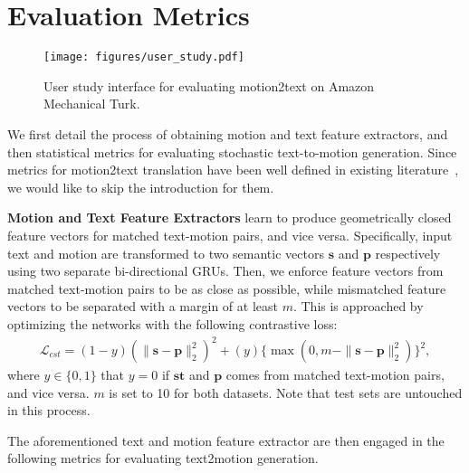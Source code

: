 \documentclass[runningheads]{llncs}
\newcommand{\beforefigcaption}{\vspace{-9mm}}
\newcommand{\afterfigcaption}{\vspace{-5mm}}
\newcommand{\beforesection}{\vspace{-2mm}}
\newcommand{\aftersection}{\vspace{-2mm}}
\begin{document}
\beforesection
\section{Evaluation Metrics}
\aftersection

\begin{figure*}[t]
	\centering
	\texttt{[image: figures/user\_study.pdf]}
		 \beforefigcaption
	\caption{User study interface for evaluating motion2text on Amazon Mechanical Turk.} 
	\label{fig:user_study}
	 \afterfigcaption
\end{figure*}

We first detail the process of obtaining motion and text feature extractors, and then statistical metrics for evaluating stochastic text-to-motion generation. Since metrics for motion2text translation have been well defined in existing literature~\cite{papineni2002bleu,zhang2019bertscore,lin2004rouge,vedantam2015cider}, we would like to skip the introduction for them.

\textbf{Motion and Text Feature Extractors} learn to produce geometrically closed feature vectors for matched text-motion pairs, and vice versa. Specifically, input text and motion are transformed to two semantic vectors $\mathbf{s}$ and $\mathbf{p}$ respectively using two separate bi-directional GRUs. Then, we enforce feature vectors from matched text-motion pairs to be as close as possible, while mismatched feature vectors to be separated with a margin of at least $m$. This is approached by optimizing the networks with the following contrastive loss:
\begin{align}
    \mathcal{L}_{cst} = (1-y)(\|\mathbf{s}-\mathbf{p}\|_2^2)^2 + (y)\{\max(0, m-\|\mathbf{s}-\mathbf{p}\|_2^2)\}^2,
\end{align}
where $y\in\{0, 1\}$ that $y=0$ if $\mathbf{st}$ and $\mathbf{p}$ comes from matched text-motion pairs, and vice versa. $m$ is set to 10 for both datasets. Note that test sets are untouched in this process.

The aforementioned text and motion feature extractor are then engaged in the following metrics for evaluating text2motion generation. 
\end{document}
